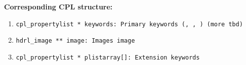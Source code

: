 \begin{datastructdef}
\textbf{Corresponding \ac{CPL} structure:}
\begin{enumerate}
    \item \texttt{cpl\_propertylist * keywords: Primary keywords (\hyperref[fits:pro.catg]{},  \hyperref[fits:pro.tech]{},  \hyperref[fits:det.id]{}) (more tbd)}
    \item \texttt{hdrl\_image ** image: Images image}
    \item \texttt{cpl\_propertylist * plistarray[]: Extension keywords}
\end{enumerate}
\end{datastructdef}


\paragraph{\hyperref[dataitem:badpix_map_det]{}}\label{dataitem:badpix_map_det}\label{dataitem:badpixmap}


